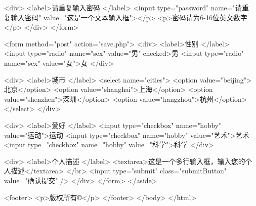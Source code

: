  <div>
    <label>请重复输入密码  </label>
    <input type="password" name="请重复输入密码" value="这是一个文本输入框"></p>
    <p>密码请为6-16位英文数字</p>
   </div>
</form> 

<form method="post" action="save.php">
    <div>
       <label>性别  </label>
       <input type="radio" name="sex" value="男" checked>男
       <input type="radio" name="sex" value="女">女
     </div>
	 
	 <div>
       <label>城市  </label>
     <select name="cities">
       <option value="beijing">北京</option>
       <option value="shanghai">上海</option>
       <option value="shenzhen">深圳</option>
       <option value="hangzhou">杭州</option>
     </select>
	 </div>
    
	<div>
    <label>爱好  </label>
       <input type="checkbox" name="hobby" value="运动">运动
       <input type="checkbox" name="hobby" value="艺术">艺术
       <input type="checkbox" name="hobby" value="科学">科学
    </div>
	
	<div>
     <label>个人描述  </label>
        <textarea>这是一个多行输入框，输入您的个人描述</textarea>
		</br>
        <input type="submit" class="submitButton" value="确认提交" />
    </div>
</form>
</aside>

<footer>
<p>版权所有©</p>
</footer>
</body>
</html>